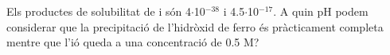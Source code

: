 \begin{exr}
Els productes de solubilitat de  i  són 4$\cdot$10$^{-38}$ i 4.5$\cdot$10$^{-17}$. A quin pH podem considerar que la precipitació de l'hidròxid de ferro és pràcticament completa mentre que l'ió  queda a una concentració de 0.5 M?
\end{exr}